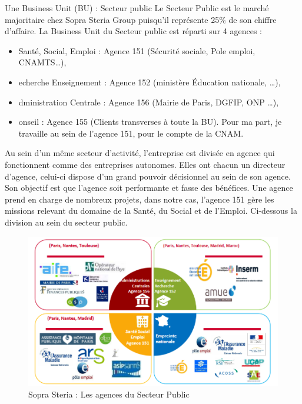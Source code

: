 Une Business Unit (BU) : Secteur public 
Le Secteur Public est le marché majoritaire chez Sopra Steria Group puisqu’il représente 25\% de son chiffre d’affaire.  La Business Unit du Secteur public est réparti sur 4 agences :  

\begin{itemize}
    \item Santé, Social, Emploi : Agence 151 (Sécurité sociale, Pole emploi, CNAMTS…), 
    \item echerche Enseignement : Agence 152 (ministère Éducation nationale, …), 
    \item dministration Centrale : Agence 156 (Mairie de Paris, DGFIP, ONP …), 
    \item onseil : Agence 155 (Clients transverses à toute la BU). Pour ma part, je travaille au sein de l’agence 151, pour le compte de la CNAM.
\end{itemize}


Au sein d'un même secteur d'activité, l'entreprise est divisée en agence qui fonctionnent comme des entreprises autonomes. Elles ont chacun un directeur d'agence, celui-ci dispose d'un grand pouvoir décisionnel au sein de son agence. Son objectif est que l'agence soit performante et fasse des bénéfices.
Une agence prend en charge de nombreux projets, dans notre cas, l'agence 151 gère les missions relevant du domaine de la Santé, du Social et de l’Emploi.
Ci-dessous la division au sein du secteur public.

\begin{figure}[!h]
\centering
\includegraphics[width=1\textwidth]{images/divisionSecteurPublic.png}
\caption{Sopra Steria : Les agences du Secteur Public}
\end{figure}

